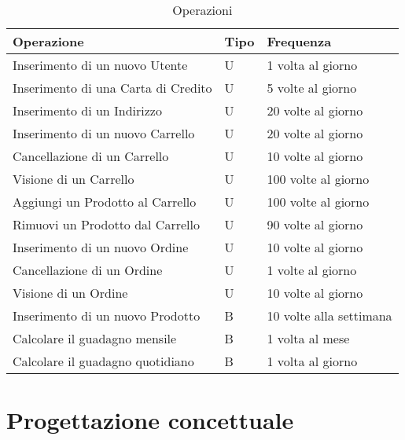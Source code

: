 \documentclass[11pt]{article}
\renewcommand{\labelitemi}{-}
\begin{document}
\begin{table}[H]
	\centering
	\begin{tabular}{|l|l|l|}
		\hline
		\textbf{Operazione} & \textbf{Tipo} & \textbf{Frequenza} \\
		\hline
		Inserimento di un nuovo Utente & U & 1 volta al giorno \\
		\hline
		Inserimento di una Carta di Credito & U & 5 volte al giorno \\
		\hline
		Inserimento di un Indirizzo & U & 20 volte al giorno \\
		\hline
		Inserimento di un nuovo Carrello & U & 20 volte al giorno \\
		\hline
		Cancellazione di un Carrello & U & 10 volte al giorno \\
		\hline
		Visione di un Carrello & U & 100 volte al giorno \\
		\hline
		Aggiungi un Prodotto al Carrello & U & 100 volte al giorno \\
		\hline
		Rimuovi un Prodotto dal Carrello & U & 90 volte al giorno \\
		\hline
		Inserimento di un nuovo Ordine & U & 10 volte al giorno \\
		\hline
		Cancellazione di un Ordine & U & 1 volte al giorno \\
		\hline
		Visione di un Ordine & U & 10 volte al giorno \\
		\hline
		Inserimento di un nuovo Prodotto & B & 10 volte alla settimana \\
		\hline
		Calcolare il guadagno mensile & B & 1 volta al mese \\
		\hline
		Calcolare il guadagno quotidiano & B & 1 volta al giorno \\
		\hline
	\end{tabular}
	\caption{Operazioni}
\end{table}

\section{Progettazione concettuale}

\renewcommand{\labelitemi}{\textbullet}
\end{document}

